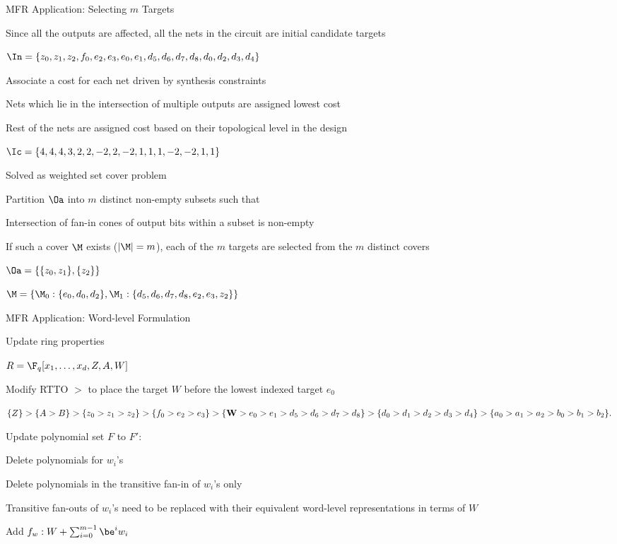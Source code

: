 \begin{frame}{\large MFR Application: Selecting $m$ Targets}
\bi
	\item Since all the outputs are affected, all the nets in the circuit are
	initial candidate targets
	\bi
		\item $\In = \{z_0,z_1,z_2,f_0,e_2,e_3,e_0,e_1,d_5,d_6,d_7,d_8,d_0,d_2,d_3,d_4\}$
		\item Associate a cost for each net driven by synthesis constraints
		\bi
			\item Nets which lie in the intersection of multiple outputs are assigned lowest cost
			\item Rest of the nets are assigned cost based on their topological level in the design
			\item $\Ic = \{4,4,4,3,2,2,-2,2,-2,1,1,1,-2,-2,1,1\}$
		\ei
	\ei
	\vspace{0.1in}
	\item Solved as weighted set cover problem
	\bi 
		\item Partition $\Oa$ into $m$ distinct non-empty subsets such that
		\bi
			\item Intersection of fan-in cones of output bits within a subset is non-empty
		\ei
		\item If such a cover $\M$ exists ($|\M|= m$), each of the $m$ targets are selected from the 
			$m$ distinct covers
		\bi
			\item {\small $\Oa = \{\{z_0,z_1\},\{z_2\}\}$}
			\item {\small $\M = \{\M_0:\{e_0,d_0,d_2\},\M_1:\{d_5,d_6,d_7,d_8,e_2,e_3,z_2\}\}$}
		\ei
	\ei
\ei
\end{frame}


\begin{frame}{\large MFR Application: Word-level Formulation}
\bi
	\item Update ring properties 
	\bi
		\item $R=\F_q[x_1,\dots,x_d,Z,A,W]$
		\item Modify RTTO $>$ to place the target $W$ before the lowest indexed target $e_0$
		\bi
			\item $\{Z\}>\{A>B\}>\{z_0>z_1>z_2\}>\{f_0>e_2>e_3\}>\{{\bf{W}}>e_0>e_1>d_5>d_6>d_7>d_8\}>
				\{d_0>d_1>d_2>d_3>d_4\}>\{a_0>a_1>a_2>b_0>b_1>b_2\}.$
		\ei
	\ei
	\vspace{0.1in}
	\item Update polynomial set $F$ to $F'$:
	\bi
		\item Delete polynomials for $w_i$'s
		\item Delete polynomials in the transitive fan-in of $w_i$'s only
		\item Transitive fan-outs of $w_i$'s need to be replaced with their equivalent 
		word-level representations in terms of $W$
		\item Add $f_w: W + \sum_{i=0}^{m-1}\be^iw_i$
	\ei

\ei
\end{frame}

